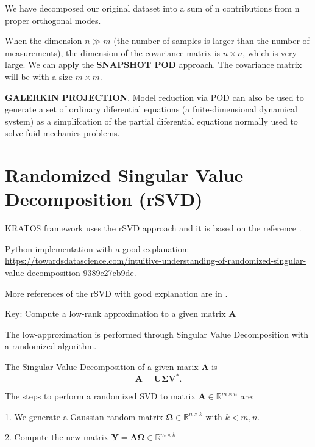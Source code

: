 \documentclass{article}
\begin{document}
We have decomposed our original dataset into a sum of n contributions from n proper 
orthogonal modes.\newline

When the dimension $n \gg m$ (the number of samples is larger than the number of measurements), the dimension of the covariance matrix is $n \times n$, which is very large. We can apply the \textbf{SNAPSHOT POD} approach. The  covariance matrix will be with a size $m \times m$. \newline

\textbf{GALERKIN PROJECTION}. Model reduction via POD can also be used to generate a set of ordinary diferential equations (a fnite-dimensional dynamical system) as a simplifcation of the partial diferential equations normally used to solve fuid-mechanics problems.

\section{Randomized Singular Value Decomposition (rSVD)}

KRATOS framework uses the rSVD approach and it is based on the reference \cite{halko10}.\newline

Python implementation with a good explanation: \url{https://towardsdatascience.com/intuitive-understanding-of-randomized-singular-value-decomposition-9389e27cb9de}.\newline

More references of the rSVD with good explanation are in \cite{erichson16}.\newline

Key: Compute a low-rank approximation to a given matrix $\bm{A}$\newline

The low-approximation is performed through Singular Value Decomposition with a randomized algorithm.\newline

The Singular Value Decomposition of a given marix $\bm{A}$ is
\begin{equation}
  \bm{A} = \bm{U}\bm{\Sigma}\bm{V}^*.
\end{equation}

The steps to perform a randomized SVD to matrix $\bm{A} \in \mathbb{R}^{m \times n}$ are:

1. We generate a Gaussian random matrix $\bm{\Omega} \in \mathbb{R}^{n \times k}$ with $k<m,n$.

2. Compute the new matrix $\bm{Y} = \bm{A}\bm{\Omega} \in \mathbb{R}^{m \times k}$
\end{document}
